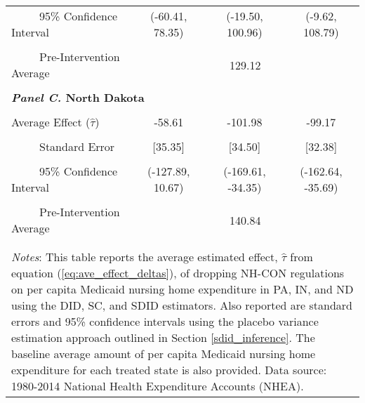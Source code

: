 \documentclass[../Main.tex]{subfiles}
\begin{document}
\begin{table}[htbp]
\begin{tabular}{l*{3}{c}}
\multicolumn{1}{l}{\ \ \ \ \ 95\% Confidence Interval}&   \multicolumn{1}{c}{(-60.41, 78.35)}&   \multicolumn{1}{c}{(-19.50, 100.96)}&   \multicolumn{1}{c}{(-9.62, 108.79)}\\
\\[-2ex]
\multicolumn{1}{l}{\ \ \ \ \ Pre-Intervention Average}&   \multicolumn{3}{c}{129.12}\\
\\[-.1ex]
\multicolumn{4}{l}{\textbf{\textit{Panel C.} North Dakota}}\\
\\[-1.5ex]
\multicolumn{1}{l}{Average Effect ($\hat{\tau}$)}&   \multicolumn{1}{c}{-58.61}&   \multicolumn{1}{c}{-101.98}&  \multicolumn{1}{c}{-99.17}\\
\\[-2ex]
\multicolumn{1}{l}{\ \ \ \ \ Standard Error}  &\multicolumn{1}{c}{[35.35]}&\multicolumn{1}{c}{[34.50]}&\multicolumn{1}{c}{[32.38]}\\
\\[-2ex]
\multicolumn{1}{l}{\ \ \ \ \ 95\% Confidence Interval}&   \multicolumn{1}{c}{(-127.89, 10.67)}&   \multicolumn{1}{c}{(-169.61, -34.35)}&   \multicolumn{1}{c}{(-162.64, -35.69)}\\
\\[-2ex]
\multicolumn{1}{l}{\ \ \ \ \ Pre-Intervention Average}&   \multicolumn{3}{c}{140.84}\\
\\[-.1ex]
\hline\hline
\\[-2ex]
\multicolumn{4}{p{.8\linewidth}}{\footnotesize \textit{Notes}: This table reports the average estimated effect, $\hat{\tau}$ from equation (\ref{eq:ave_effect_deltas}), of dropping NH-CON regulations on per capita Medicaid nursing home expenditure in PA, IN, and ND using the DID, SC, and SDID estimators. Also reported are standard errors and 95\% confidence intervals using the placebo variance estimation approach outlined in Section \ref{sdid_inference}. The baseline average amount of per capita Medicaid nursing home expenditure for each treated state is also provided. Data source: 1980-2014 National Health Expenditure Accounts (NHEA).}
\end{tabular}
\end{table}
\vfill
\clearpage
\end{document}
